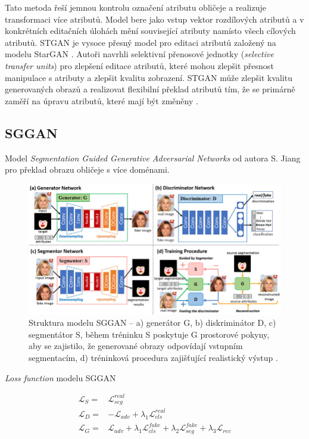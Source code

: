 \bigskip

\noindent Tato metoda řeší jemnou kontrolu označení atributu obličeje a realizuje transformaci více atributů. Model bere jako vstup vektor rozdílových atributů a v konkrétních editačních úlohách mění související atributy namísto všech cílových atributů. STGAN je vysoce přesný model pro editaci atributů založený na modelu StarGAN \cite{choi2018stargan}. Autoři navrhli selektivní přenosové jednotky (\textit{selective transfer units}) pro zlepšení editace atributů, které mohou zlepšit přesnost manipulace s atributy a zlepšit kvalitu zobrazení. STGAN může zlepšit kvalitu generovaných obrazů a realizovat flexibilní překlad atributů tím, že se primárně zaměří na úpravu atributů, které mají být změněny \cite{reviewGANs}.

\newpage

\subsection*{SGGAN}

Model \textit{Segmentation Guided Generative Adversarial Networks} od autora S. Jiang pro překlad obrazu obličeje s více doménami.

\begin{figure}[H]
	\centering
	\includegraphics[width=1\textwidth]{obrazky-figures/struct-sggan.png}
	\caption{Struktura modelu SGGAN -- a) generátor G, b) diskriminátor D, c) segmentátor S, během tréninku S poskytuje G prostorové pokyny, aby se zajistilo, že generované obrazy odpovídají vstupním segmentacím, d) tréninková procedura zajišťující realistický výstup \cite{sggan}.}
        \label{fig:sggan}
\end{figure}

\noindent \textit{Loss function} modelu SGGAN

\begin{align}
    \mathcal{L}_{S}=&\mathcal{L}_{seg}^{real} \\[-1pt]
    \mathcal{L}_{D}=&-\mathcal{L}_{adv} +\lambda _{1} \mathcal{L}_{cls}^{real} \\[-1pt]
    \mathcal{L}_{G}=&\mathcal{L}_{adv} +\lambda _{1} \mathcal{L}_{cls}^{fake} +\lambda _{2} \mathcal{L}_{seg}^{fake} +\lambda _{3} \mathcal{L}_{rec}
    \label{eq:SGGANObj}
\end{align}

